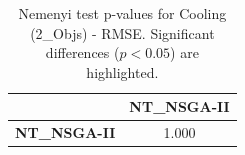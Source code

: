 \begin{table}[h!]
\centering
\scriptsize
\begin{tabular}{lc}
\toprule
 & NT\_NSGA-II \\
\midrule
\textbf{NT\_NSGA-II} & 1.000 \\
\bottomrule
\end{tabular}
\caption{Nemenyi test p-values for Cooling (2_Objs) - RMSE. Significant differences ($p < 0.05$) are highlighted.}
\label{tab:nemenyi_nemenyi_Cooling_2_Objs_Test_RMSE}
\end{table}